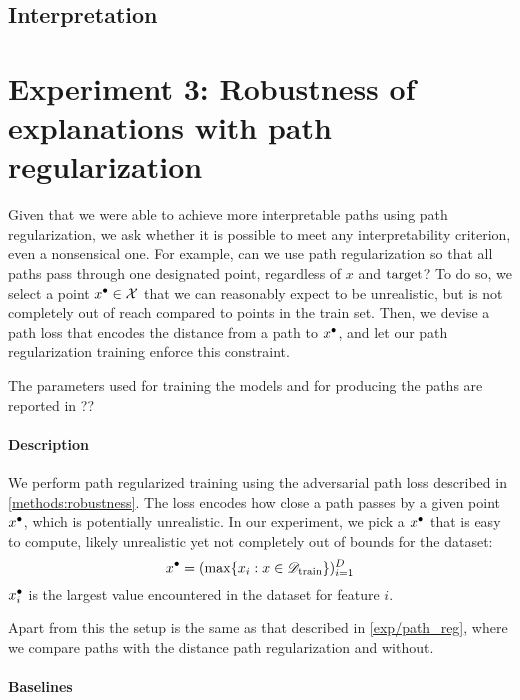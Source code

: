 \documentclass[../main.tex]{subfiles}
\begin{document}
\subsection{Interpretation}

\section{Experiment 3: Robustness of explanations with path regularization}


Given that we were able to achieve more interpretable paths using path regularization, we ask whether it is possible to meet any interpretability criterion, even a nonsensical one.
For example, can we use path regularization so that all paths pass through one designated point, regardless of $x$ and $\mathrm{target}$?
To do so, we select a point $x^\bullet \in \mathcal{X}$ that we can reasonably expect to be unrealistic, but is not completely out of reach compared to points in the train set.
Then, we devise a path loss that encodes the distance from a path to $x^\bullet$, and let our path regularization training enforce this constraint.

The parameters used for training the models and for producing the paths are reported in ?? 

\paragraph{Description}

We perform path regularized training using the adversarial path loss described in \autoref{methods:robustness}.
The loss encodes how close a path passes by a given point $x^\bullet$, which is potentially unrealistic.
In our experiment, we pick a $x^\bullet$ that is easy to compute, likely unrealistic yet not completely out of bounds for the dataset:
\begin{equation}
    x^\bullet = (\max\{ x_i : x \in \mathscr{D}_\text{train} \})_{i=1}^D
\end{equation}
\ie{} $x^\bullet_i$ is the largest value encountered in the dataset for feature $i$.

Apart from this the setup is the same as that described in \autoref{exp/path_reg}, where we compare paths with the distance path regularization and without.

\paragraph{Baselines}
\end{document}
